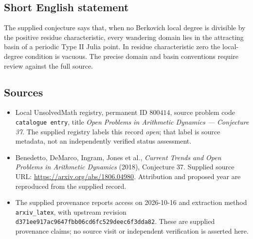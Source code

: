 \documentclass[11pt]{article}
\begin{document}
\subsection{Short English statement}
The supplied conjecture says that, when no Berkovich local degree is divisible by the positive residue characteristic, every wandering domain lies in the attracting basin of a periodic Type II Julia point. In residue characteristic zero the local-degree condition is vacuous. The precise domain and basin conventions require review against the full source.
\subsection{Sources}
\begin{itemize}
\item Local UnsolvedMath registry, permanent ID \(800414\), source problem code \texttt{catalogue entry}, title \emph{Open Problems in Arithmetic Dynamics --- Conjecture 37}. The supplied registry labels this record \emph{open}; that label is source metadata, not an independently verified status assessment.
\item Benedetto, DeMarco, Ingram, Jones et al., \emph{Current Trends and Open Problems in Arithmetic Dynamics} (2018), Conjecture 37. Supplied source URL: \url{https://arxiv.org/abs/1806.04980}. Attribution and proposed year are reproduced from the supplied record.
\item The supplied provenance reports access on 2026-10-16 and extraction method \texttt{arxiv\_latex}, with upstream revision \texttt{d371ee917ac9647fbb06cd6fc529deec6f3dda82}. These are supplied provenance claims; no source visit or independent verification is asserted here.
\end{itemize}
\end{document}
